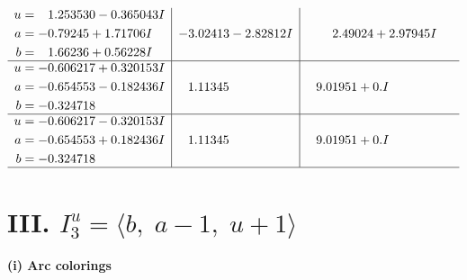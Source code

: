 \documentclass[1p]{elsarticle_modified}
\theoremstyle{definition}
\begin{document}
$$\begin{array}{c|c|c}
\begin{aligned}
u &= \phantom{-}1.253530 - 0.365043 I \\
a &= -0.79245 + 1.71706 I \\
b &= \phantom{-}1.66236 + 0.56228 I\end{aligned}
 & -3.02413 - 2.82812 I & \phantom{-}2.49024 + 2.97945 I \\ \hline\begin{aligned}
u &= -0.606217 + 0.320153 I \\
a &= -0.654553 - 0.182436 I \\
b &= -0.324718\phantom{ +0.000000I}\end{aligned}
 & \phantom{-}1.11345\phantom{ +0.000000I} & \phantom{-}9.01951 + 0. I\phantom{ +0.000000I} \\ \hline\begin{aligned}
u &= -0.606217 - 0.320153 I \\
a &= -0.654553 + 0.182436 I \\
b &= -0.324718\phantom{ +0.000000I}\end{aligned}
 & \phantom{-}1.11345\phantom{ +0.000000I} & \phantom{-}9.01951 + 0. I\phantom{ +0.000000I}\\
 \hline 
 \end{array}$$\newpage\newpage\renewcommand{\arraystretch}{1}
\centering \section*{III. $I^u_{3}= \langle b,\;a-1,\;u+1 \rangle$}
\flushleft \textbf{(i) Arc colorings}\\
\end{document}
